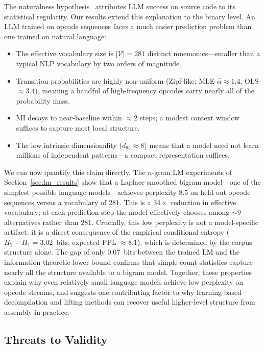 \documentclass[10pt,twocolumn]{article}
\begin{document}
The naturalness hypothesis~\cite{hindle2012naturalness} attributes LLM success
on source code to its statistical regularity.  Our results extend this
explanation to the binary level.  An LLM trained on opcode sequences faces a
much easier prediction problem than one trained on natural language:
\begin{itemize}
  \item The effective vocabulary size is $|\mathcal{V}| = 281$
        distinct mnemonics---smaller than a typical NLP vocabulary by two orders
        of magnitude.
  \item Transition probabilities are highly non-uniform (Zipf-like;
        MLE $\hat{\alpha} \approx 1.4$, OLS $\approx 3.4$), meaning a handful
        of high-frequency opcodes carry nearly all of the probability mass.
  \item MI decays to near-baseline within $\approx 2$ steps; a modest
        context window suffices to capture most local structure.
  \item The low intrinsic dimensionality ($d_{95} \approx 8$) means that
        a model need not learn millions of independent patterns---a compact
        representation suffices.
\end{itemize}
We can now quantify this claim directly.  The $n$-gram LM experiments of
Section~\ref{sec:lm_results} show that a Laplace-smoothed bigram model---one of
the simplest possible language models---achieves perplexity $8.5$ on held-out
opcode sequences versus a vocabulary of $281$.  This is a $34\times$ reduction
in effective vocabulary; at each prediction step the model effectively chooses
among $\sim\!9$ alternatives rather than $281$.  Crucially, this low perplexity
is not a model-specific artifact: it is a direct consequence of the empirical
conditional entropy ($H_2 - H_1 = 3.02$~bits, expected PPL $\approx 8.1$),
which is determined by the corpus structure alone.  The gap of only $0.07$~bits
between the trained LM and the information-theoretic lower bound confirms that
simple count statistics capture nearly all the structure available to a bigram
model.  Together, these properties explain why even relatively small language
models achieve low perplexity on opcode streams, and suggests one contributing
factor to why learning-based decompilation and lifting methods can recover
useful higher-level structure from assembly in practice.

\subsection{Threats to Validity}
\end{document}
